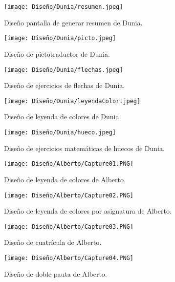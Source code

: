 \begin{figure}[ht!]
  \centering
  \texttt{[image: Diseño/Dunia/resumen.jpeg]}
  \caption{Diseño pantalla de generar resumen de Dunia.}
  \label{dunia2}
\end{figure}

\begin{figure}[ht!]
  \centering
  \texttt{[image: Diseño/Dunia/picto.jpeg]}
  \caption{Diseño de pictotraductor de Dunia.}
  \label{dunia3}
\end{figure}

\begin{figure}[ht!]
  \centering
  \texttt{[image: Diseño/Dunia/flechas.jpeg]}
  \caption{Diseño de ejercicios de flechas de Dunia.}
  \label{dunia4}
\end{figure}

\begin{figure}[ht!]
  \centering
  \texttt{[image: Diseño/Dunia/leyendaColor.jpeg]}
  \caption{Diseño de leyenda de colores de Dunia.}
  \label{dunia5}
\end{figure}

\begin{figure}[ht!]
  \centering
  \texttt{[image: Diseño/Dunia/hueco.jpeg]}
  \caption{Diseño de ejercicios matemáticas de huecos de Dunia.}
  \label{dunia6}
\end{figure}



\begin{figure}[ht!]
  \centering
\texttt{[image: Diseño/Alberto/Capture01.PNG]}
  \caption{Diseño de leyenda de colores de Alberto.}
\end{figure}

\begin{figure}[ht!]
  \centering
\texttt{[image: Diseño/Alberto/Capture02.PNG]}
  \caption{Diseño de leyenda de colores por asignatura de Alberto.}
\end{figure}

\begin{figure}[ht!]
  \centering
\texttt{[image: Diseño/Alberto/Capture03.PNG]}
  \caption{Diseño de cuatrícula de Alberto.}
\end{figure}

\begin{figure}[ht!]
  \centering
\texttt{[image: Diseño/Alberto/Capture04.PNG]}
  \caption{Diseño de doble pauta de Alberto.}
\end{figure}

